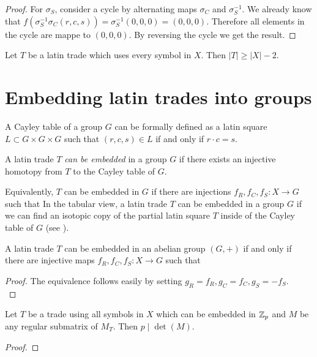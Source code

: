 \begin{proof}
For $\sigma_S$, consider a cycle by alternating maps $\sigma_C$ and $\sigma_S^{-1}$. We already know that $f(\sigma_S^{-1}\sigma_C(r,c,s)) = \sigma_S^{-1}(0,0,0) = (0,0,0)$. Therefore all elements in the cycle are mappe to $(0,0,0)$. By reversing the cycle we get the result.

\end{proof}

\begin{cor}
Let $T$ be a latin trade which uses every symbol in $X$. Then $|T| \geq |X|-2$.
\end{cor}%


\section{Embedding latin trades into groups}

A Cayley table of a group $G$ can be formally defined as a latin square $L \subset G \times G \times G$ such that $(r,c,s) \in L$ if and only if $r \cdot c = s$.

\begin{defn}
A latin trade $T$ \emph{can be embedded} in a group $G$ if there exists an injective homotopy from $T$ to the Cayley table of $G$.
\end{defn}

Equivalently, $T$ can be embedded in $G$ if there are injections $f_R,f_C,f_S : X \rightarrow G$ such that
In the tabular view, a latin trade $T$ can be embedded in a group $G$ if we can find an isotopic copy of the partial latin square $T$ inside of the Cayley table of $G$ (see ).

\begin{lem}
A latin trade $T$ can be embedded in an abelian group $(G,+)$ if and only if there are injective maps $f_R,f_C,f_S : X \rightarrow G$ such that
\end{lem}
\begin{proof}
The equivalence follows easily by setting $g_R = f_R, g_C = f_C, g_S = -f_S$. \\
\end{proof}

\begin{lem}
Let $T$ be a trade using all symbols in $X$ which can be embedded in $\mathbb Z_p$ and $M$ be any regular submatrix of $M_T$. Then $p \mid \det(M)$.
\end{lem}
\begin{proof}
\end{proof}

